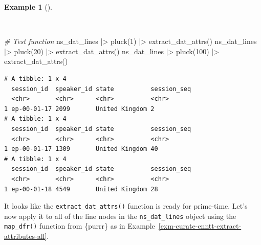 \documentclass[
  letterpaper,
  krantz1]{latex/krantz-mod}
\newenvironment{Shaded}{\begin{snugshade}}{\end{snugshade}}
\newcommand{\CommentTok}[1]{\textcolor[rgb]{0.00,0.00,0.00}{\textit{#1}}}
\newcommand{\DecValTok}[1]{\textcolor[rgb]{0.00,0.00,0.00}{#1}}
\newcommand{\FunctionTok}[1]{\textcolor[rgb]{0.00,0.00,0.00}{#1}}
\newcommand{\NormalTok}[1]{\textcolor[rgb]{0.00,0.00,0.00}{#1}}
\newcommand{\SpecialCharTok}[1]{\textcolor[rgb]{0.00,0.00,0.00}{#1}}
\theoremstyle{definition}
\theoremstyle{definition}
\newtheorem{example}{Example}[chapter]
\theoremstyle{remark}
\begin{document}
\begin{example}[]\protect\hypertarget{exm-curate-enntt-test-extract-attributes-function}{}\label{exm-curate-enntt-test-extract-attributes-function}

~

\begin{Shaded}
\begin{Highlighting}[numbers=left,,]
\CommentTok{\# Test function}
\NormalTok{ns\_dat\_lines }\SpecialCharTok{|\textgreater{}} \FunctionTok{pluck}\NormalTok{(}\DecValTok{1}\NormalTok{) }\SpecialCharTok{|\textgreater{}} \FunctionTok{extract\_dat\_attrs}\NormalTok{()}
\NormalTok{ns\_dat\_lines }\SpecialCharTok{|\textgreater{}} \FunctionTok{pluck}\NormalTok{(}\DecValTok{20}\NormalTok{) }\SpecialCharTok{|\textgreater{}} \FunctionTok{extract\_dat\_attrs}\NormalTok{()}
\NormalTok{ns\_dat\_lines }\SpecialCharTok{|\textgreater{}} \FunctionTok{pluck}\NormalTok{(}\DecValTok{100}\NormalTok{) }\SpecialCharTok{|\textgreater{}} \FunctionTok{extract\_dat\_attrs}\NormalTok{()}
\end{Highlighting}
\end{Shaded}

\begin{verbatim}
# A tibble: 1 x 4
  session_id  speaker_id state          session_seq
  <chr>       <chr>      <chr>          <chr>      
1 ep-00-01-17 2099       United Kingdom 2          
# A tibble: 1 x 4
  session_id  speaker_id state          session_seq
  <chr>       <chr>      <chr>          <chr>      
1 ep-00-01-17 1309       United Kingdom 40         
# A tibble: 1 x 4
  session_id  speaker_id state          session_seq
  <chr>       <chr>      <chr>          <chr>      
1 ep-00-01-18 4549       United Kingdom 28         
\end{verbatim}

\end{example}

It looks like the \texttt{extract\_dat\_attrs()} function is ready for
prime-time. Let's now apply it to all of the line nodes in the
\texttt{ns\_dat\_lines} object using the \texttt{map\_dfr()} function
from \{purrr\} as in
Example~\ref{exm-curate-enntt-extract-attributes-all}.
\end{document}
